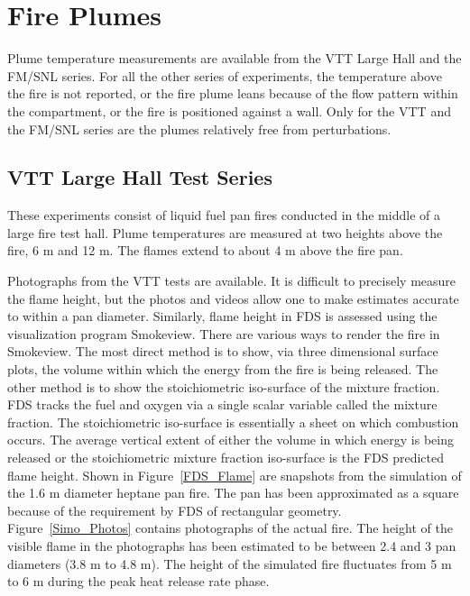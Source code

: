 \chapter{Fire Plumes}

Plume temperature measurements are available from the VTT Large Hall and the FM/SNL series.
For all the other series of experiments, the temperature above the fire is not reported, or the fire plume
leans because of the flow pattern within the compartment, or the fire is positioned against a wall.
Only for the VTT and the FM/SNL series are the plumes relatively free from perturbations.

\section{VTT Large Hall Test Series}

These experiments consist of liquid fuel pan fires conducted in the middle of a large fire test hall.
Plume temperatures are measured at two heights above the fire, 6 m and 12 m.
The flames extend to about 4 m above the fire pan.

Photographs from the VTT tests are available. It is difficult to precisely measure the flame height,
but the photos and videos allow one to make estimates accurate to within a pan diameter.
Similarly, flame height in FDS is assessed using the visualization program Smokeview.
There are various ways to render the fire in Smokeview.  The
most direct method is to show, via three dimensional surface plots, the volume within which the energy from the fire is being released.
The other method is to show the stoichiometric iso-surface of the mixture fraction.
FDS tracks the fuel and oxygen via a single scalar variable called the mixture fraction.
The stoichiometric iso-surface is essentially a sheet on which combustion occurs.  The average vertical extent of either the volume
in which energy is being released or the stoichiometric mixture fraction iso-surface is the FDS predicted flame height.
Shown in Figure~\ref{FDS_Flame} are snapshots from the simulation of the 1.6 m diameter heptane pan fire.
The pan has been approximated as a square because of the requirement by FDS of rectangular geometry.
Figure~\ref{Simo_Photos} contains photographs of the actual fire.
The height of the visible flame in the photographs has been estimated to be between 2.4 and 3 pan diameters (3.8 m to 4.8 m).
The height of the simulated fire fluctuates from 5 m to 6 m during the peak heat release rate phase.


